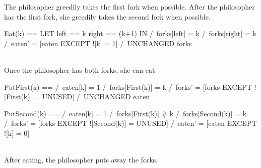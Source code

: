 The philosopher greedily takes the first fork when possible. After the
philosopher has the first fork, she greedily takes the second fork when
possible.
\\

\begin{tla}
Eat(k) == 
    LET 
        left == k 
        right == (k+1) %
    IN 
        /\ forks[left] = k
        /\ forks[right] = k
        /\ eaten' = [eaten EXCEPT ![k] = 1]
        /\ UNCHANGED forks 
\end{tla}
\begin{tlatex}
%
\@x{ \.{\LET}}%
%
%
\@x{ \.{\IN}}%
%
%
%
\end{tlatex}
\\

Once the philosopher has both forks, she can eat. 
\\
\begin{tla}
PutFirst(k) == 
    /\ eaten[k] = 1
    /\ forks[First(k)] = k 
    /\ forks' = [forks EXCEPT ![First(k)] = UNUSED]
    /\ UNCHANGED eaten

PutSecond(k) == 
    /\ eaten[k] = 1
    /\ forks[First(k)] # k 
    /\ forks[Second(k)] = k 
    /\ forks' = [forks EXCEPT ![Second(k)] = UNUSED]
    /\ eaten' = [eaten EXCEPT ![k] = 0]
\end{tla}
\begin{tlatex}
%
%
%
%
\@pvspace{8.0pt}%
%
%
%
%
\end{tlatex}
\\

After eating, the philosopher puts away the forks.

